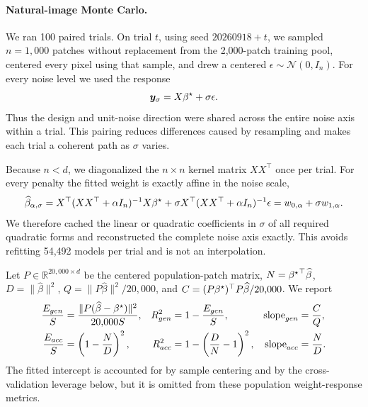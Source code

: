 \paragraph{Natural-image Monte Carlo.}
We ran 100 paired trials.  On trial $t$, using seed $20260918+t$, we sampled
$n=1,000$ patches without replacement from the 2,000-patch training pool,
centered every pixel using that sample, and drew a centered
$\epsilon\sim\mathcal N(0,I_n)$.  For every noise level we used the response
\begin{equation}
  \bm y_\sigma=X{\beta^{\star}}+\sigma\epsilon .
  \label{eq:app-vh-response}
\end{equation}
Thus the design and unit-noise direction were shared across the entire noise
axis within a trial.  This pairing reduces differences caused by resampling
and makes each trial a coherent path as $\sigma$ varies.

Because $n<d$, we diagonalized the $n\times n$ kernel matrix $XX^\top$ once
per trial.  For every penalty the fitted weight is exactly affine in the
noise scale,
\begin{equation}
 \widehat\beta_{\alpha,\sigma}
 =X^\top(XX^\top+\alpha I_n)^{-1}X{\beta^{\star}}
 +\sigma X^\top(XX^\top+\alpha I_n)^{-1}\epsilon
 =w_{0,\alpha}+\sigma w_{1,\alpha}.
 \label{eq:app-vh-affine-noise}
\end{equation}
We therefore cached the linear or quadratic coefficients in $\sigma$ of all
required quadratic forms and reconstructed the complete noise axis exactly.
This avoids refitting 54,492 models per trial and is not an interpolation.

Let $P\in\mathbb R^{20,000\times d}$ be the centered population-patch matrix,
$N={\beta^{\star}}^\top\widehat\beta$, $D=\|\widehat\beta\|^2$,
$Q=\|P\widehat\beta\|^2/20{,}000$, and
$C=(P{\beta^{\star}})^\top P\widehat\beta/20{,}000$.  We report
\begin{align}
 \frac{E_{gen}}S
 &=\frac{\|P(\widehat\beta-{\beta^{\star}})\|^2}{20{,}000S},
 &R^2_{gen}&=1-\frac{E_{gen}}S,
 &\operatorname{slope}_{gen}&=\frac CQ,\\
 \frac{E_{acc}}S
 &=\left(1-\frac ND\right)^2,
 &R^2_{acc}&=1-\left(\frac DN-1\right)^2,
 &\operatorname{slope}_{acc}&=\frac ND.
 \label{eq:app-vh-metrics}
\end{align}
The fitted intercept is accounted for by sample centering and by the
cross-validation leverage below, but it is omitted from these population
weight-response metrics.

